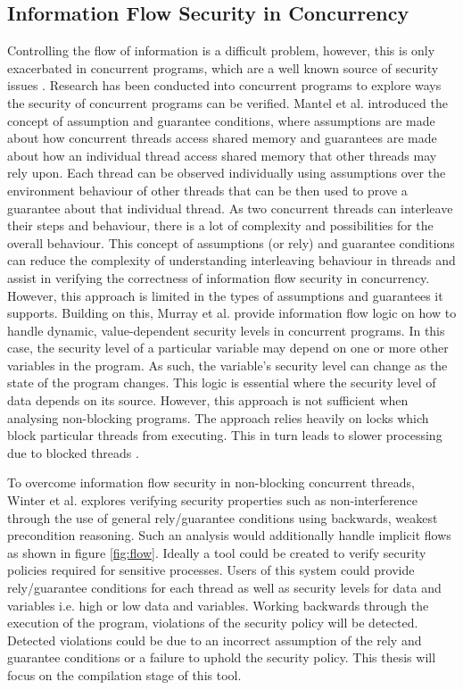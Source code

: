 \documentclass[twocolumn]{article}
\begin{document}
\subsection{Information Flow Security in Concurrency}
Controlling the flow of information is a difficult problem, however, this is only exacerbated in concurrent programs, which are a well known source of security issues \cite{mantel2014noninterference}\cite{smith2019value}\cite{vaughan2012secure}. Research has been conducted into concurrent programs to explore ways the security of concurrent programs can be verified. Mantel et al. \cite{mantel2011assumptions} introduced the concept of assumption and guarantee conditions, where assumptions are made about how concurrent threads access shared memory and guarantees are made about how an individual thread access shared memory that other threads may rely upon. Each thread can be observed individually using assumptions over the environment behaviour of other threads that can be then used to prove a guarantee about that individual thread. As two concurrent threads can interleave their steps and behaviour, there is a lot of complexity and possibilities for the overall behaviour. This concept of assumptions (or rely) and guarantee conditions can reduce the complexity of understanding interleaving behaviour in threads and assist in verifying the correctness of information flow security in concurrency. However, this approach is limited in the types of assumptions and guarantees it supports. Building on this, Murray et al. \cite{ernst2019seccsl} \cite{murray2018covern} provide information flow logic on how to handle dynamic, value-dependent security levels in concurrent programs. In this case, the security level of a particular variable may depend on one or more other variables in the program. As such, the variable's security level can change as the state of the program changes. This logic is essential where the security level of data depends on its source. However, this approach is not sufficient when analysing non-blocking programs. The approach relies heavily on locks which block particular threads from executing. This in turn leads to slower processing due to blocked threads \cite{prakash1991non}.

To overcome information flow security in non-blocking concurrent threads, Winter et al. \cite{winter2020information} explores verifying security properties such as non-interference through the use of general rely/guarantee conditions using backwards, weakest precondition reasoning. Such an analysis would additionally handle implicit flows as shown in figure \ref{fig:flow}. Ideally a tool could be created to verify security policies required for sensitive processes. Users of this system could provide rely/guarantee conditions for each thread as well as security levels for data and variables i.e. high or low data and variables. Working backwards through the execution of the program, violations of the security policy will be detected. Detected violations could be due to an incorrect assumption of the rely and guarantee conditions or a failure to uphold the security policy. This thesis will focus on the compilation stage of this tool.
\end{document}
